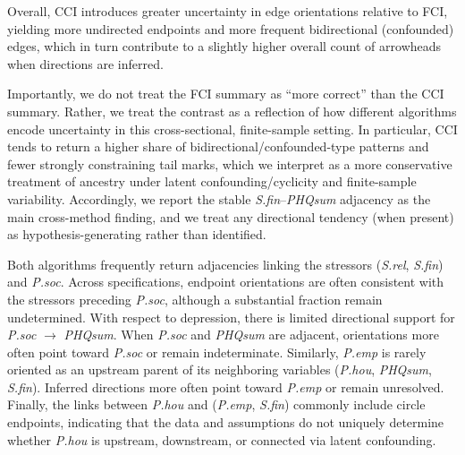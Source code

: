 \documentclass[
]{article}
\begin{document}
Overall, CCI introduces greater uncertainty in edge orientations
relative to FCI, yielding more undirected endpoints and more frequent
bidirectional (confounded) edges, which in turn contribute to a slightly
higher overall count of arrowheads when directions are inferred.

Importantly, we do not treat the FCI summary as ``more correct'' than
the CCI summary. Rather, we treat the contrast as a reflection of how
different algorithms encode uncertainty in this cross-sectional,
finite-sample setting. In particular, CCI tends to return a higher share
of bidirectional/confounded-type patterns and fewer strongly
constraining tail marks, which we interpret as a more conservative
treatment of ancestry under latent confounding/cyclicity and
finite-sample variability. Accordingly, we report the stable
\textit{S.fin}--\textit{PHQsum} adjacency as the main cross-method
finding, and we treat any directional tendency (when present) as
hypothesis-generating rather than identified.

Both algorithms frequently return adjacencies linking the stressors
(\textit{S.rel}, \textit{S.fin}) and \textit{P.soc}. Across
specifications, endpoint orientations are often consistent with the
stressors preceding \textit{P.soc}, although a substantial fraction
remain undetermined. With respect to depression, there is limited
directional support for \textit{P.soc} \(\rightarrow\) \textit{PHQsum}.
When \textit{P.soc} and \textit{PHQsum} are adjacent, orientations more
often point toward \textit{P.soc} or remain indeterminate. Similarly,
\textit{P.emp} is rarely oriented as an upstream parent of its
neighboring variables (\textit{P.hou}, \textit{PHQsum}, \textit{S.fin}).
Inferred directions more often point toward \textit{P.emp} or remain
unresolved. Finally, the links between \textit{P.hou} and
(\textit{P.emp}, \textit{S.fin}) commonly include circle endpoints,
indicating that the data and assumptions do not uniquely determine
whether \textit{P.hou} is upstream, downstream, or connected via latent
confounding.
\end{document}
